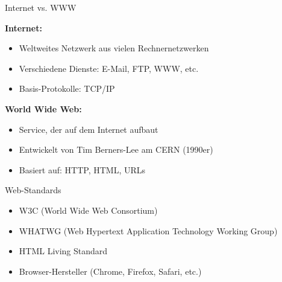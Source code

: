 \begin{concept}{Internet vs. WWW}

    \textbf{Internet:}
    \begin{itemize}
        \item Weltweites Netzwerk aus vielen Rechnernetzwerken
        \item Verschiedene Dienste: E-Mail, FTP, WWW, etc.
        \item Basis-Protokolle: TCP/IP
    \end{itemize}
    
    \textbf{World Wide Web:}
    \begin{itemize}
        \item Service, der auf dem Internet aufbaut
        \item Entwickelt von Tim Berners-Lee am CERN (1990er)
        \item Basiert auf: HTTP, HTML, URLs
    \end{itemize}
\end{concept}

\begin{concept}{Web-Standards}
    \begin{itemize}
        \item W3C (World Wide Web Consortium)
        \item WHATWG (Web Hypertext Application Technology Working Group)
        \item HTML Living Standard
        \item Browser-Hersteller (Chrome, Firefox, Safari, etc.)
    \end{itemize}
\end{concept}
